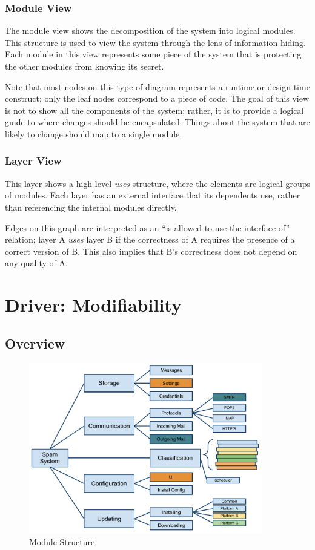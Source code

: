 \documentclass[letterpaper,11pt]{article}
\begin{document}
\subsubsection{Module View}

The module view shows the decomposition of the system into logical modules.
This structure is used to view the system through the lens of information
hiding.  Each module in this view represents some piece of the system that is
protecting the other modules from knowing its secret.

Note that most nodes on this type of diagram represents a runtime or
design-time construct; only the leaf nodes correspond to a piece of code.  The
goal of this view is not to show all the components of the system; rather, it
is to provide a logical guide to where changes should be encapsulated.  Things
about the system that are likely to change should map to a single module.

\subsubsection{Layer View}
This layer shows a high-level \textit{uses} structure, where the elements are
logical groups of modules.  Each layer has an external interface that its
dependents use, rather than referencing the internal modules directly.

Edges on this graph are interpreted as an ``is allowed to use the interface
of'' relation; layer A \textit{uses} layer B if the correctness of A requires
the presence of a correct version of B.  This also implies that B's
correctness does not depend on any quality of A.


\section{Driver: Modifiability}
\label{sec:mod}

\subsection{Overview}
\begin{figure}[h]
  \centering
  \includegraphics[width=4in]{ArchModuleDecomp.pdf}
  \caption{Module Structure}
  \label{fig:mod1}
\end{figure}
\end{document}
